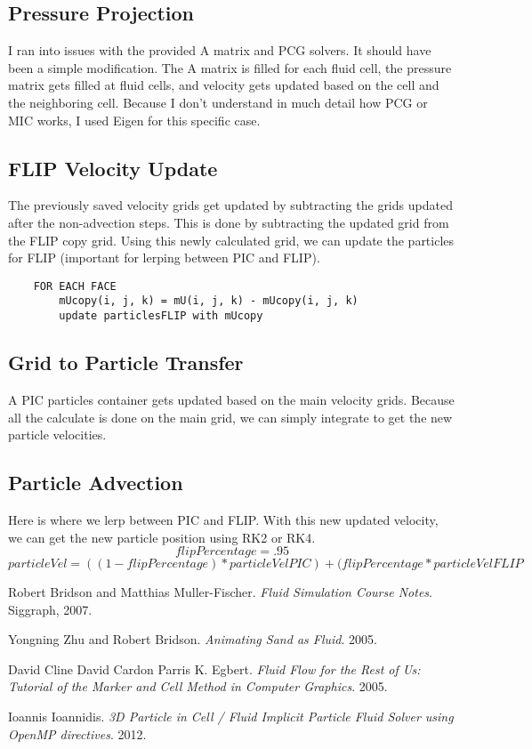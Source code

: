 \documentclass[a4paper]{article}
\begin{document}
    \subsection{Pressure Projection}
    I ran into issues with the provided A matrix and PCG solvers. It should have been a simple modification. The A matrix is filled for each fluid cell, the pressure matrix gets filled at fluid cells, and velocity gets updated based on the cell and the neighboring cell. Because I don't understand in much detail how PCG or MIC works, I used Eigen for this specific case. 
    
    \subsection{FLIP Velocity Update}
    The previously saved velocity grids get updated by subtracting the grids updated after the non-advection steps. This is done by subtracting the updated grid from the FLIP copy grid. Using this newly calculated grid, we can update the particles for FLIP (important for lerping between PIC and FLIP). 
    \begin{lstlisting}
    FOR EACH FACE
        mUcopy(i, j, k) = mU(i, j, k) - mUcopy(i, j, k)
        update particlesFLIP with mUcopy
    \end{lstlisting}
    
    \subsection{Grid to Particle Transfer}
    A PIC particles container gets updated based on the main velocity grids. Because all the calculate is done on the main grid, we can simply integrate to get the new particle velocities. 
    
    \subsection{Particle Advection}
    Here is where we lerp between PIC and FLIP. With this new updated velocity, we can get the new particle position using RK2 or RK4.
    \[ flipPercentage = .95 \]
    \[ particleVel = ((1 - flipPercentage) * particleVelPIC) + (flipPercentage * particleVelFLIP \] 
    
    
    \begin{thebibliography}{9}
    
    Robert Bridson and Matthias Muller-Fischer.
    \textit{Fluid Simulation Course Notes}. Siggraph, 2007.
    
    Yongning Zhu and Robert Bridson.
    \textit{Animating Sand as Fluid}. 2005.
    
    David Cline David Cardon Parris K. Egbert.
    \textit{Fluid Flow for the Rest of Us: Tutorial of the Marker and Cell Method in
    Computer Graphics}. 2005.
    
    Ioannis Ioannidis.
    \textit{3D Particle in Cell / Fluid Implicit Particle Fluid Solver using OpenMP directives}. 2012.
    \end{thebibliography}
    
\end{document}
